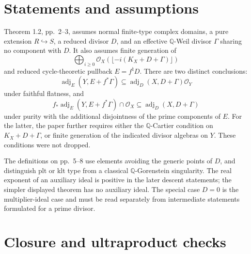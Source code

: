 \documentclass[10pt]{article}
\begin{document}
\section*{Statements and assumptions}
Theorem 1.2, pp. 2–3, assumes normal finite-type complex domains, a pure extension \(R\hookrightarrow S\), a reduced divisor \(D\), and an effective \(\mathbb Q\)-Weil divisor \(\Gamma\) sharing no component with \(D\). It also assumes finite generation of \[\bigoplus_{i\geq0}\mathcal O_X(\lfloor-i(K_X+D+\Gamma)\rfloor)\] and reduced cycle-theoretic pullback \(E=f^\natural D\). There are two distinct conclusions: \[\operatorname{adj}_E(Y,E+f^*\Gamma)
 \subseteq \operatorname{adj}_D(X,D+\Gamma)\mathcal O_Y\] under faithful flatness, and \[f_*\operatorname{adj}_E(Y,E+f^*\Gamma)\cap\mathcal O_X
 \subseteq\operatorname{adj}_D(X,D+\Gamma)\] under purity with the additional disjointness of the prime components of \(E\). For the latter, the paper further requires either the \(\mathbb Q\)-Cartier condition on \(K_X+D+\Gamma\), or finite generation of the indicated divisor algebras on \(Y\). These conditions were not dropped.\par
The definitions on pp. 5–8 use elements avoiding the generic points of \(D\), and distinguish plt or klt type from a classical \(\mathbb Q\)-Gorenstein singularity. The real exponent of an auxiliary ideal is positive in the later descent statements; the simpler displayed theorem has no auxiliary ideal. The special case \(D=0\) is the multiplier-ideal case and must be read separately from intermediate statements formulated for a prime divisor.\par
\section*{Closure and ultraproduct checks}
\end{document}
